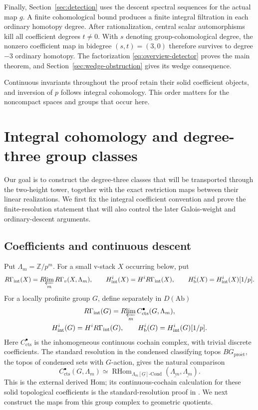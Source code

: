 \documentclass[11pt]{article}
\numberwithin{equation}{section}
\theoremstyle{definition}
\theoremstyle{remark}
\newcommand{\Z}{\mathbb Z}
\newcommand{\cts}{\mathrm{cts}}
\DeclareMathOperator{\RHom}{RHom}
\newcommand{\Rlim}{R\!\varprojlim}
\begin{document}
Finally, Section~\ref{sec:detection} uses the descent spectral
sequences for the actual map \(g\). A finite cohomological bound
produces a finite integral filtration in each ordinary homotopy
degree. After rationalization, central scalar automorphisms kill
all coefficient degrees \(t\ne0\). With \(s\) denoting group-cohomological
degree, the nonzero coefficient map in bidegree \((s,t)=(3,0)\) therefore survives to degree \(-3\) ordinary
homotopy. The factorization \eqref{eq:overview-detector} proves the
main theorem, and Section~\ref{sec:wedge-obstruction} gives its
wedge consequence.

Continuous invariants throughout the proof retain their solid
coefficient objects, and inversion of \(p\) follows integral cohomology.
This order matters for the noncompact spaces and groups that occur here.

\section{Integral cohomology and degree-three group classes}
\label{sec:cohomology}

Our goal is to construct the degree-three classes that will be transported
through the two-height tower, together with the exact restriction maps
between their linear realizations. We first fix the integral coefficient
convention and prove the finite-resolution statement that will also
control the later Galois-weight and ordinary-descent arguments.

\subsection{Coefficients and continuous descent}

Put $\Lambda_m=\Z/p^m$.  For a small v-stack $X$ occurring below, put
\[
 R\Gamma_{\mathrm{int}}(X)
   =\Rlim_m R\Gamma_v(X,\Lambda_m),\qquad
 H^i_{\mathrm{int}}(X)=H^iR\Gamma_{\mathrm{int}}(X),\qquad
 H^i_{\mathrm b}(X)=H^i_{\mathrm{int}}(X)[1/p].
\]
For a locally profinite group $G$, define separately in $D(\mathrm{Ab})$
\begin{equation}\label{eq:integral-group-cochains}
\begin{gathered}
 R\Gamma_{\mathrm{int}}(G)=\Rlim_m C_{\cts}^{\bullet}(G,\Lambda_m),
 \\
 H^i_{\mathrm{int}}(G)=H^iR\Gamma_{\mathrm{int}}(G),
 \qquad H^i_{\mathrm b}(G)=H^i_{\mathrm{int}}(G)[1/p].
\end{gathered}
\end{equation}
Here $C_{\cts}^{\bullet}$ is the inhomogeneous continuous cochain complex,
with trivial discrete coefficients.  The standard resolution in the
condensed classifying topos $BG_{\mathrm{pro\acute et}}$, the topos of
condensed sets with $G$-action, gives the natural comparison
\[
 C_{\cts}^{\bullet}(G,\Lambda_m)\simeq
 \RHom_{\Lambda_m[\underline G]\text{-}\mathrm{Cond}}
       (\underline{\Lambda_m},\underline{\Lambda_m}).
\]
This is the external derived Hom; its continuous-cochain calculation for
these solid topological coefficients is the standard-resolution proof in
\cite[\S2, pp.~5--7, Lemmas~2.1--2.2]{Anschutz2020}.
We next construct the maps from this group complex to geometric quotients.
\end{document}
